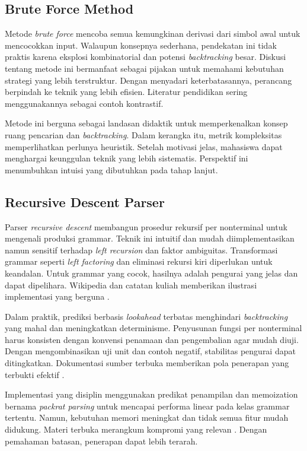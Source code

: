 \documentclass[../main.tex]{subfiles}
\begin{document}
\subsection{Brute Force Method}
Metode \emph{brute force} mencoba semua kemungkinan derivasi dari simbol awal untuk mencocokkan input. Walaupun konsepnya sederhana, pendekatan ini tidak praktis karena eksplosi kombinatorial dan potensi \emph{backtracking} besar. Diskusi tentang metode ini bermanfaat sebagai pijakan untuk memahami kebutuhan strategi yang lebih terstruktur. Dengan menyadari keterbatasannya, perancang berpindah ke teknik yang lebih efisien. Literatur pendidikan sering menggunakannya sebagai contoh kontrastif.

Metode ini berguna sebagai landasan didaktik untuk memperkenalkan konsep ruang pencarian dan \emph{backtracking}. Dalam kerangka itu, metrik kompleksitas memperlihatkan perlunya heuristik. Setelah motivasi jelas, mahasiswa dapat menghargai keunggulan teknik yang lebih sistematis. Perspektif ini menumbuhkan intuisi yang dibutuhkan pada tahap lanjut.

\subsection{Recursive Descent Parser}
Parser \emph{recursive descent} membangun prosedur rekursif per nonterminal untuk mengenali produksi grammar. Teknik ini intuitif dan mudah diimplementasikan namun sensitif terhadap \emph{left recursion} dan faktor ambiguitas. Transformasi grammar seperti \emph{left factoring} dan eliminasi rekursi kiri diperlukan untuk keandalan. Untuk grammar yang cocok, hasilnya adalah pengurai yang jelas dan dapat dipelihara. Wikipedia dan catatan kuliah memberikan ilustrasi implementasi yang berguna \citep{WikiRecursiveDescent,CS143}.

Dalam praktik, prediksi berbasis \emph{lookahead} terbatas menghindari \emph{backtracking} yang mahal dan meningkatkan determinisme. Penyusunan fungsi per nonterminal harus konsisten dengan konvensi penamaan dan pengembalian agar mudah diuji. Dengan mengombinasikan uji unit dan contoh negatif, stabilitas pengurai dapat ditingkatkan. Dokumentasi sumber terbuka memberikan pola penerapan yang terbukti efektif \citep{CS143}.

Implementasi yang disiplin menggunakan predikat penampilan dan memoization bernama \emph{packrat parsing} untuk mencapai performa linear pada kelas grammar tertentu. Namun, kebutuhan memori meningkat dan tidak semua fitur mudah didukung. Materi terbuka merangkum kompromi yang relevan \citep{CS143}. Dengan pemahaman batasan, penerapan dapat lebih terarah.
\end{document}
